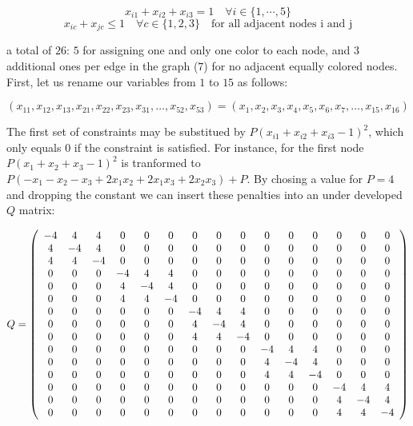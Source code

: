 $$ x_{i1} + x_{i2} + x_{i3} = 1 \quad \forall i \in \{1, \cdots, 5\} $$
$$ x_{ic} + x_{jc} \leq 1 \quad \forall c \in \{1, 2, 3\} \quad \text{for all adjacent nodes i and j} $$

a total of $26$: $5$ for  assigning one and only one color to each node, and $3$ additional ones per edge in the graph ($7$) for no adjacent equally colored nodes. First, let us rename our variables from $1$ to $15$ as follows:

$$ (x_{11}, x_{12}, x_{13}, x_{21}, x_{22}, x_{23}, x_{31}, \dots, x_{52}, x_{53}) =
	(x_1, x_2, x_3, x_4, x_5, x_6, x_7, \dots, x_{15}, x_{16}) $$

The first set of constraints may be substitued by $P(x_{i1} + x_{i2} + x_{i3} - 1)^2$, which only equals $0$ if the constraint is satisfied. For instance, for the first node $P(x_1 + x_2 + x_3 - 1)^2$ is tranformed to $P(- x_1 - x_2 - x_3 + 2 x_1 x_2 + 2 x_1 x_3 + 2 x_2 x_3) + P$. By chosing a value for $P=4$ and dropping the constant we can  insert these penalties into an under developed $Q$ matrix:

$$
Q = 
\left(
\begin{array}{*{15}c}
	-4 & 4 & 4 & 0 & 0 & 0 & 0 & 0 & 0 & 0 & 0 & 0 & 0 & 0 & 0 \\
	4 & -4 & 4 & 0 & 0 & 0 & 0 & 0 & 0 & 0 & 0 & 0 & 0 & 0 & 0 \\
	4 & 4 & -4 & 0 & 0 & 0 & 0 & 0 & 0 & 0 & 0 & 0 & 0 & 0 & 0 \\
	0 & 0 & 0 & -4 & 4 & 4 & 0 & 0 & 0 & 0 & 0 & 0 & 0 & 0 & 0 \\
	0 & 0 & 0 & 4 & -4 & 4 & 0 & 0 & 0 & 0 & 0 & 0 & 0 & 0 & 0 \\
	0 & 0 & 0 & 4 & 4 & -4 & 0 & 0 & 0 & 0 & 0 & 0 & 0 & 0 & 0 \\
	0 & 0 & 0 & 0 & 0 & 0 & -4 & 4 & 4 & 0 & 0 & 0 & 0 & 0 & 0 \\
	0 & 0 & 0 & 0 & 0 & 0 & 4 & -4 & 4 & 0 & 0 & 0 & 0 & 0 & 0 \\
	0 & 0 & 0 & 0 & 0 & 0 & 4 & 4 & -4 & 0 & 0 & 0 & 0 & 0 & 0 \\
	0 & 0 & 0 & 0 & 0 & 0 & 0 & 0 & 0 & -4 & 4 & 4 & 0 & 0 & 0 \\
	0 & 0 & 0 & 0 & 0 & 0 & 0 & 0 & 0 & 4 & -4 & 4 & 0 & 0 & 0 \\
	0 & 0 & 0 & 0 & 0 & 0 & 0 & 0 & 0 & 4 & 4 & -4 & 0 & 0 & 0 \\
	0 & 0 & 0 & 0 & 0 & 0 & 0 & 0 & 0 & 0 & 0 & 0 & -4 & 4 & 4 \\
	0 & 0 & 0 & 0 & 0 & 0 & 0 & 0 & 0 & 0 & 0 & 0 & 4 & -4 & 4 \\
	0 & 0 & 0 & 0 & 0 & 0 & 0 & 0 & 0 & 0 & 0 & 0 & 4 & 4 & -4 
\end{array}
\right)
$$

